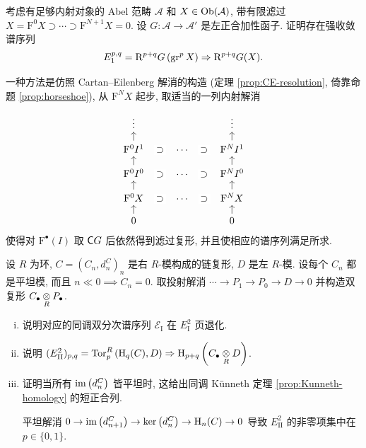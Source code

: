\begin{Exercises}
	\item 考虑有足够内射对象的 Abel 范畴 $\mathcal{A}$ 和 $X \in \operatorname{Ob}(\mathcal{A})$, 带有限滤过 $X = \mathrm{F}^0 X \supset \cdots \supset \mathrm{F}^{N+1} X = 0$. 设 $G: \mathcal{A} \to \mathcal{A}'$ 是左正合加性函子. 证明存在强收敛谱序列
	\[ E_1^{p,q} = \mathrm{R}^{p+q} G \left( \operatorname{gr}^p X \right) \Rightarrow \mathrm{R}^{p+q}G(X). \]
	\begin{hint}
		一种方法是仿照 Cartan--Eilenberg 解消的构造 (定理 \ref{prop:CE-resolution}, 倚靠命题 \ref{prop:horseshoe}), 从 $\mathrm{F}^N X$ 起步, 取适当的一列内射解消
		\[\begin{tikzcd}[row sep=small]
			\vdots & & \vdots \\
			\mathrm{F}^0 I^1 \arrow[u] \arrow[phantom, r, "\supset" description] & \cdots \arrow[phantom, r, "\supset" description] & \mathrm{F}^N I^1 \arrow[u] \\
			\mathrm{F}^0 I^0 \arrow[u] \arrow[phantom, r, "\supset" description] & \cdots \arrow[phantom, r, "\supset" description] & \mathrm{F}^N I^0 \arrow[u] \\
			\mathrm{F}^0 X \arrow[u] \arrow[phantom, r, "\supset" description] & \cdots \arrow[phantom, r, "\supset" description] & \mathrm{F}^N X \arrow[u] \\
			0 \arrow[u] & & 0 \arrow[u]
		\end{tikzcd}\]
		使得对 $\mathrm{F}^\bullet (I)$ 取 $\mathsf{C}G$ 后依然得到滤过复形, 并且使相应的谱序列满足所求.
	\end{hint}

	\item 设 $R$ 为环, $C = \left(C_n, d^C_n\right)_n$ 是右 $R$-模构成的链复形, $D$ 是左 $R$-模. 设每个 $C_n$ 都是平坦模, 而且 $n \ll 0 \implies C_n = 0$. 取投射解消 $\cdots \to P_1 \to P_0 \to D \to 0$ 并构造双复形 $C_\bullet \underset{R}{\otimes} P_\bullet$.
	\begin{enumerate}[(i)]
		\item 说明对应的同调双分次谱序列 $\mathscr{E}_{\mathrm{I}}$ 在 $E_{\mathrm{I}}^2$ 页退化.
		\item 说明 $(E_{\mathrm{II}}^2)_{p,q} = \operatorname{Tor}^R_p\left( \operatorname{H}_q(C), D \right) \Rightarrow \operatorname{H}_{p+q}\left( C_\bullet \underset{R}{\otimes} D \right)$.
		\item 证明当所有 $\operatorname{im}\left( d^C_n \right)$ 皆平坦时, 这给出同调 Künneth 定理 \ref{prop:Kunneth-homology} 的短正合列.
		\begin{hint}
			平坦解消 $0 \to \operatorname{im}\left( d^C_{n+1} \right) \to \operatorname{ker}\left(d^C_n\right) \to \operatorname{H}_n(C) \to 0$ 导致 $E_{\mathrm{II}}^2$ 的非零项集中在 $p \in \{0, 1\}$.
		\end{hint}
	\end{enumerate}


\end{Exercises}
